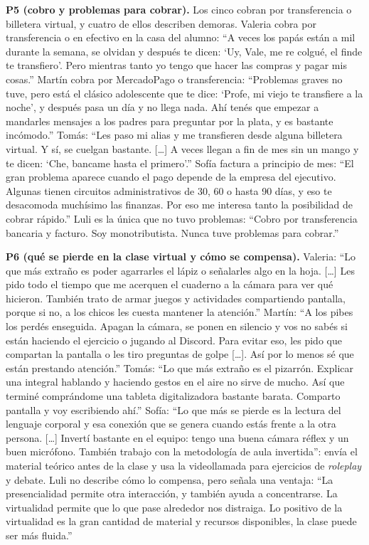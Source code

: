\textbf{P5 (cobro y problemas para cobrar).} Los cinco cobran por
transferencia o billetera virtual, y cuatro de ellos describen demoras.
Valeria cobra por transferencia o en efectivo en la casa del alumno:
``A veces los papás están a mil durante la semana, se olvidan y después
te dicen: `Uy, Vale, me re colgué, el finde te transfiero'. Pero
mientras tanto yo tengo que hacer las compras y pagar mis cosas.''
Martín cobra por MercadoPago o transferencia: ``Problemas graves no
tuve, pero está el clásico adolescente que te dice: `Profe, mi viejo te
transfiere a la noche', y después pasa un día y no llega nada. Ahí
tenés que empezar a mandarles mensajes a los padres para preguntar por
la plata, y es bastante incómodo.'' Tomás: ``Les paso mi alias y me
transfieren desde alguna billetera virtual. Y sí, se cuelgan bastante.
[\ldots] A veces llegan a fin de mes sin un mango y te dicen: `Che,
bancame hasta el primero'.'' Sofía factura a principio de mes: ``El gran
problema aparece cuando el pago depende de la empresa del ejecutivo.
Algunas tienen circuitos administrativos de 30, 60 o hasta 90 días, y
eso te desacomoda muchísimo las finanzas. Por eso me interesa tanto la
posibilidad de cobrar rápido.'' Luli es la única que no tuvo problemas:
``Cobro por transferencia bancaria y facturo. Soy monotributista. Nunca
tuve problemas para cobrar.''

\textbf{P6 (qué se pierde en la clase virtual y cómo se compensa).}
Valeria: ``Lo que más extraño es poder agarrarles el lápiz o señalarles
algo en la hoja. [\ldots] Les pido todo el tiempo que me acerquen el
cuaderno a la cámara para ver qué hicieron. También trato de armar
juegos y actividades compartiendo pantalla, porque si no, a los chicos
les cuesta mantener la atención.'' Martín: ``A los pibes los perdés
enseguida. Apagan la cámara, se ponen en silencio y vos no sabés si
están haciendo el ejercicio o jugando al Discord. Para evitar eso, les
pido que compartan la pantalla o les tiro preguntas de golpe [\ldots].
Así por lo menos sé que están prestando atención.'' Tomás: ``Lo que más
extraño es el pizarrón. Explicar una integral hablando y haciendo gestos
en el aire no sirve de mucho. Así que terminé comprándome una tableta
digitalizadora bastante barata. Comparto pantalla y voy escribiendo
ahí.'' Sofía: ``Lo que más se pierde es la lectura del lenguaje corporal
y esa conexión que se genera cuando estás frente a la otra persona.
[\ldots] Invertí bastante en el equipo: tengo una buena cámara réflex y
un buen micrófono. También trabajo con la metodología de aula
invertida'': envía el material teórico antes de la clase y usa la
videollamada para ejercicios de \emph{roleplay} y debate. Luli no
describe cómo lo compensa, pero señala una ventaja: ``La presencialidad
permite otra interacción, y también ayuda a concentrarse. La virtualidad
permite que lo que pase alrededor nos distraiga. Lo positivo de la
virtualidad es la gran cantidad de material y recursos disponibles, la
clase puede ser más fluida.''

